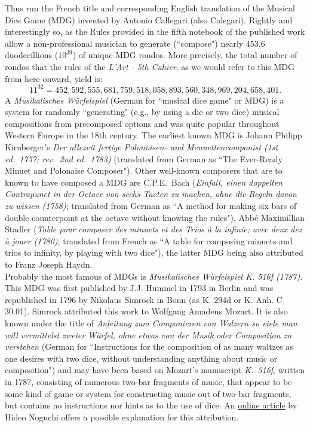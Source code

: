 \documentclass[a4paper,x11names,svgnames,10pt]{article}
\begin{document}
{Thus run the French title and corresponding English translation of the Musical Dice Game (MDG) invented by Antonio Callegari (also Calegari).  Rightly and interestingly so, as the Rules provided in the fifth notebook of the published work allow a non-professional musician to generate (``compose") nearly 453.6 duodecillions ($10^{39}$) of unique MDG rondos.  More precisely, the total number of rondos that the rules of the {\it L'Art - 5th Cahier}, as we would refer to this MDG from here onward, yield is: $$11^{32} = 452\!,592\!,555\!,681\!,759\!,518\!,058\!,893\!,560\!,348\!,969\!,204\!,658\!,401.$$
\noindent A {\it Musikalisches W\"{u}rfelspiel} (German for ``musical dice game" or MDG) is a system for randomly ``generating" (e.g., by using a die or two dice) musical compositions from precomposed options and was quite popular throughout Western Europe in the 18th century.  The earliest known MDG is Johann Philipp Kirnberger's {\em Der allezeit fertige Polonoisen- und Menuettencomponist (1st ed.\ 1757; rev.\ 2nd ed.\ 1783)} (translated from German as ``The Ever-Ready Minuet and Polonaise Composer").  Other well-known composers that are to known to have composed a MDG are C.P.E.\ Bach ({\em Einfall, einen doppelten Contrapunct in der Octave von sechs Tacten zu machen, ohne die Regeln davon zu wissen (1758)}; translated from German as ``A method for making six bars of double counterpoint at the octave without knowing the rules"), Abb\'{e} Maximillian Stadler ({\em Table pour composer des minuets et des Trios \`{a} la infinie; avec deux dez \`{a} jouer (1780)}; translated from French as ``A table for composing minuets and trios to infinity, by playing with two dice"), the latter MDG being also attributed to Franz Joseph Haydn.\\

Probably the most famous of MDGs is {\it Musikalisches W\"{u}rfelspiel K. 516f (1787)}.  This MDG was first published by J.J. Hummel in 1793 in Berlin and was republished in 1796 by Nikolaus Simrock in Bonn (as K. 294d or K. Anh. C 30.01). Simrock attributed this work to Wolfgang Amadeus Mozart. It is also known under the title of {\em Anleitung zum Componieren von Walzern so viele man will vermittelst zweier W\"{u}rfel, ohne etwas von der Musik oder Composition zu verstehen} (German for ``Instructions for the composition of as many waltzes as one desires with two dice, without understanding anything about music or composition") and may have been based on Mozart's manuscript {\em K.\ 516f}, written in 1787, consisting of numerous two-bar fragments of music, that appear to be some kind of game or system for constructing music out of two-bar fragments, but contains no instructions nor hints as to the use of dice.  An \href{(http://www.asahi-net.or.jp/\~rb5h-ngc/e/k516f.htm}{online article} by Hideo Noguchi offers a possible explanation for this attribution.\\

}
\end{document}
